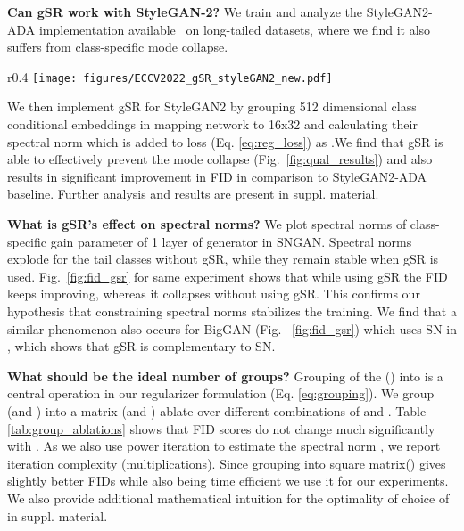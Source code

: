 \documentclass[runningheads,table]{llncs}
\begin{document}
 \noindent \textbf{Can gSR work with StyleGAN-2?} We train and analyze the StyleGAN2-ADA implementation available~\cite{kang2020contrastive} on long-tailed datasets, where we find it also suffers from class-specific mode collapse.
 \setlength{\intextsep}{0pt}\begin{wrapfigure}{r}{0.4\textwidth}
    \texttt{[image: figures/ECCV2022\_gSR\_styleGAN2\_new.pdf]}
    \caption{\textbf{StyleGAN2-ADA}  On CIFAR-10 (), comparison of gSR with the baseline.}
    \label{fig:qual_results}
\end{wrapfigure} We then implement gSR for StyleGAN2 by grouping 512 dimensional class conditional embeddings in mapping network to 16x32 and calculating their spectral norm which is added to loss (Eq. \ref{eq:reg_loss}) as .We find that gSR is able to effectively prevent the mode collapse (Fig.\ \ref{fig:qual_results}) and also results in significant improvement in FID in comparison to StyleGAN2-ADA baseline. Further analysis and results are present in suppl. material.
 
\noindent\textbf{What is gSR's effect on spectral norms?}  We plot spectral norms of class-specific gain parameter of 1 layer of generator in SNGAN. Spectral norms explode for the tail classes without gSR, while they remain stable when gSR is used. Fig.~\ref{fig:fid_gsr} for same experiment shows that while using gSR the FID keeps improving, whereas it collapses without using gSR.  This confirms our hypothesis that constraining spectral norms stabilizes the training. We find that a similar phenomenon also occurs for BigGAN (Fig. ~\ref{fig:fid_gsr}) which uses SN in , which shows that gSR is complementary to SN.



\noindent\textbf{What should be the ideal number of groups?} Grouping of the () into  is a central operation in our regularizer formulation (Eq. \ref{eq:grouping}). We group  (and )  into a matrix  (and ) ablate over different combinations of  and . Table \ref{tab:group_ablations} shows that FID scores do not change much significantly with . As we also use power iteration to estimate the spectral norm , we report iteration complexity (multiplications). Since grouping into square matrix() gives slightly better FIDs while also being time efficient we use it for our experiments. We also provide additional mathematical intuition for the optimality of choice of  in suppl. material. 
\end{document}
